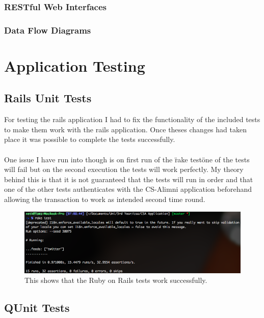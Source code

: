 \documentclass{article}
\begin{document}
\subsubsection{RESTful Web Interfaces}

\subsubsection{Data Flow Diagrams}


\newpage
\section{Application Testing}

\subsection{Rails Unit Tests}

For testing the rails application I had to fix the functionality of the included tests to make them work with the rails application. Once theses changes had taken place it was possible to complete the tests successfully.\\
\\
One issue I have run into though is on first run of the \"rake test\" one of the tests will fail but on the second execution the tests will work perfectly. My theory behind this is that it is not guaranteed that the tests will run in order and that one of the other tests authenticates with the CS-Alimni application beforehand allowing the transaction to work as intended second time round.

\begin{figure}[H]
\centering
\includegraphics[width=\textwidth]{railstests}
\caption{This shows that the Ruby on Rails tests work successfully.}
\end{figure}

\subsection{QUnit Tests}
\end{document}
